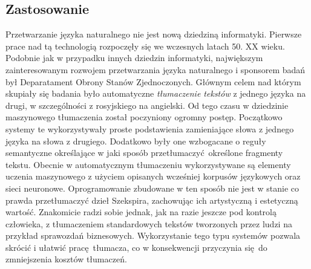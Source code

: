 \documentclass[a4paper, twoside, 12pt]{report}
\begin{document}
        \subsection {Zastosowanie}
            Przetwarzanie języka naturalnego nie jest nową dziedziną informatyki. Pierwsze prace nad tą technologią
            rozpoczęły się we wczesnych latach 50. XX wieku. Podobnie jak w przypadku innych dziedzin informatyki,
            największym zainteresowanym rozwojem przetwarzania języka naturalnego i sponsorem badań był Deparatament
            Obrony Stanów Zjednoczonych. Głównym celem nad którym skupiały się badania było automatyczne
            \emph{tłumaczenie tekstów} z jednego języka na drugi, w szczególności z rosyjskiego na
            angielski\cite{NLPHISTORY}. Od tego czasu w dziedzinie maszynowego tłumaczenia został poczyniony
            ogromny postęp. Początkowo systemy te wykorzystywały proste podstawienia zamieniające słowa z jednego
            języka na słowa z drugiego. Dodatkowo były one wzbogacane o reguły semantyczne określające w jaki
            sposób przetłumaczyć określone fragmenty tekstu.  Obecnie w automatycznym tłumaczeniu wykorzystywane
            są elementy uczenia maszynowego z użyciem opisanych wcześniej korpusów językowych oraz sieci neuronowe.
            Oprogramowanie zbudowane w ten sposób nie jest w stanie co prawda przetłumaczyć dzieł Szekspira,
            zachowując ich artystyczną i estetyczną wartość. Znakomicie radzi sobie jednak, jak na razie jeszcze
            pod kontrolą człowieka, z tłumaczeniem standardowych tekstów tworzonych przez ludzi na przykład
            sprawozdań biznesowych\cite{INTROTOMACHINETRANSLATION}. Wykorzystanie tego typu systemów pozwala skrócić i
            ułatwić pracę tłumacza, co w konsekwencji przyczynia się do zmniejszenia kosztów tłumaczeń.
\end{document}

